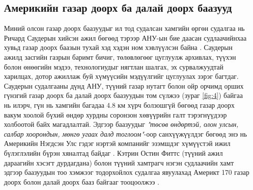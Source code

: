 \documentclass[10pt,twocolumn,letterpaper]{article}
\begin{document}
\subsection{Америкийн газар доорх ба далай доорх баазууд}

Миний олсон газар доорх баазуудыг ил тод судалсан хамгийн өргөн судалгаа нь Ричард Саудерын хийсэн ажил бөгөөд тэрээр АНУ-ын бие даасан судлаачийнхаа хувьд газар доорх баазын тухай хэд хэдэн ном хэвлүүлсэн байна \cite{22}. Саудерын ажилд засгийн газрын баримт бичиг, төлөвлөгөөг цуглуулж архивлах, түүхэн болон өнөөгийн мэдээ, технологиудыг нягтлан шалгах, эх сурвалжуудтай харилцах, дотор ажиллаж буй хүмүүсийн мэдүүлгийг цуглуулах зэрэг багтдаг. Саудерын судалгааны дүнд АНУ, түүний газар нутагт болон ойр орчимд орших гүнзгий газар доорх ба далай доорх баазуудын том сүлжээ (зураг \ref{fig:4}) байгаа нь илэрч, гүн нь хамгийн багадаа 4.8 км хүрч болзошгүй бөгөөд газар доорх вакум хоолой бүхий өндөр хурдны соронзон хөвүүрийн галт тэрэгнүүдээр холбоотой байх магадлалтай. Эдгээр баазуудыг \textit{"төсөв өндөртэй, олон улсын, салбар хоорондын, мөнгө угаах далд тоглоом"}-оор санхүүжүүлдэг бөгөөд энэ нь Америкийн Нэгдсэн Улс гэдэг нэртэй компанийг эзэмшдэг хүмүүстэй ижил бүлэглэлийн бүрэн хяналтад байдаг \cite{22}. Кэтрин Остин Фиттс (түүний ажил дараагийн хэсэгт дурдагдана) болон түүний хамтрагч нэгэн судлаачийн хамт эдгээр баазуудын тоо хэмжээг тодорхойлох судалгаа явуулахад Америкт 170 газар доорх болон далай доорх бааз байгааг тооцоолжээ \cite{16,20}.
\end{document}
